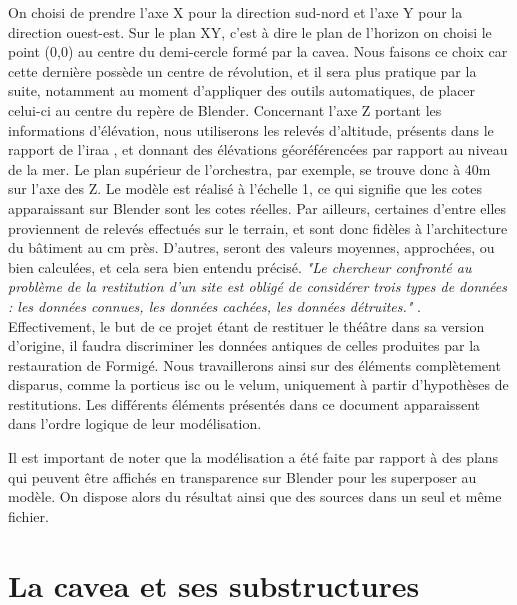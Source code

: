 On choisi de prendre l'axe X pour la direction sud-nord et l'axe Y pour la direction ouest-est. Sur le plan XY, c'est à dire le plan de l'horizon on choisi le point (0,0) au centre du demi-cercle formé par la \gls{cavea}. Nous faisons ce choix car cette dernière possède un centre de révolution, et il sera plus pratique par la suite, notamment au moment d'appliquer des outils automatiques, de placer celui-ci au centre du repère de Blender. Concernant l'axe Z portant les informations d'élévation, nous utiliserons les relevés d'altitude, présents dans le rapport de l'\gls{iraa} \cite[Pl. XXIX, XLIV, XLVIII, XLIX, LX]{orangePl}, et donnant des élévations géoréférencées par rapport au niveau de la mer. Le plan supérieur de l'\gls{orchestra}, par exemple, se trouve donc à 40m sur l'axe des Z. Le modèle est réalisé à l'échelle 1, ce qui signifie que les cotes apparaissant sur Blender sont les cotes réelles. Par ailleurs, certaines d'entre elles proviennent de relevés effectués sur le terrain, et sont donc fidèles à l'architecture du bâtiment au cm près. D'autres, seront des valeurs moyennes, approchées, ou bien calculées, et cela sera bien entendu précisé. \textit{"Le chercheur confronté au problème de la restitution d’un site est obligé de considérer trois types de données : les données connues, les données cachées, les données détruites."} \cite[p. 27]{golvin}. Effectivement, le but de ce projet étant de restituer le théâtre dans sa version d'origine, il faudra discriminer les données antiques de celles produites par la restauration de Formigé. Nous travaillerons ainsi sur des éléments complètement disparus, comme la \gls{porticus isc} ou le \gls{velum}, uniquement à partir d'hypothèses de restitutions. Les différents éléments présentés dans ce document apparaissent dans l'ordre logique de leur modélisation.

Il est important de noter que la modélisation a été faite par rapport à des plans qui peuvent être affichés en transparence sur Blender pour les superposer au modèle. On dispose alors du résultat ainsi que des sources dans un seul et même fichier.

\section{La  \gls{cavea} et ses substructures}  
	\label{La cavea et ses substructures}

